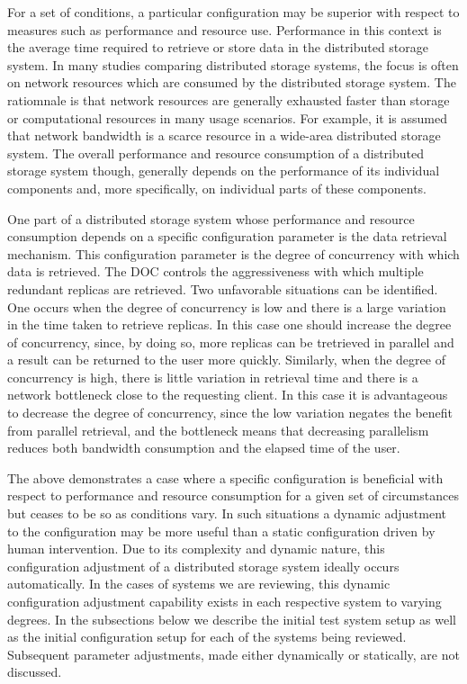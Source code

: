 \documentclass[11pt]{article}
\begin{document}
For a set of conditions, a particular configuration may be superior with 
respect to measures such as performance and resource use. Performance in 
this context is the average time required to retrieve or store data in the 
distributed storage system. In many studies comparing distributed storage 
systems, the focus is often on network resources which are consumed by the 
distributed storage system. The ratiomnale is that network resources are 
generally exhausted faster than storage or computational resources in many 
usage scenarios. For example, it is assumed that network bandwidth is a 
scarce resource in a wide-area distributed storage system. The overall 
performance and resource consumption of a distributed storage system though, 
generally depends on the performance of its individual components and, more 
specifically, on individual parts of these components.

One part of a distributed storage system whose performance and resource 
consumption depends on a specific configuration parameter is the data 
retrieval mechanism. This configuration parameter is the degree of 
concurrency with which data is retrieved. The DOC controls the 
aggressiveness with which multiple redundant replicas are retrieved. Two 
unfavorable situations can be identified. One occurs when the degree of 
concurrency is low and there is a large variation in the time taken to 
retrieve replicas. In this case one should increase the degree of 
concurrency, since, by doing so, more replicas can be tretrieved in 
parallel and a result can be returned to the user more quickly. Similarly, 
when the degree of concurrency is high, there is little variation in 
retrieval time and there is a network bottleneck close to the requesting 
client. In this case it is advantageous to decrease the degree of concurrency, 
since the low variation negates the benefit from parallel retrieval, and the 
bottleneck means that decreasing parallelism reduces both bandwidth 
consumption and the elapsed time of the user.

The above demonstrates a case where a specific configuration is beneficial 
with respect to performance and resource consumption for a given set of 
circumstances but ceases to be so as conditions vary. In such situations 
a dynamic adjustment to the configuration may be more useful than a static 
configuration driven by human intervention. Due to its complexity and 
dynamic nature, this configuration adjustment of a distributed storage 
system ideally occurs automatically. In the cases of systems we are 
reviewing, this dynamic configuration adjustment capability exists in 
each respective system to varying degrees. In the subsections below we 
describe the initial test system setup as well as the initial 
configuration setup for each of the systems being reviewed. Subsequent 
parameter adjustments, made either dynamically or statically, are not 
discussed.  
\end{document}
